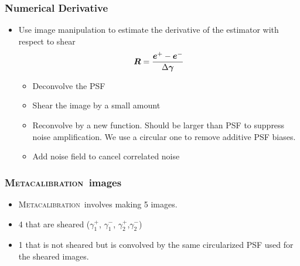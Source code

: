 \documentclass{beamer}
\newcommand{\Mcal}{\textsc{Metacalibration}}
\newcommand{\mcalR}{\mbox{\boldmath $R$}}
\newcommand{\vecg}{\mbox{\boldmath $\gamma$}}
\newcommand{\vest}{\mbox{\boldmath $e$}}
\begin{document}
\frame
{
    \frametitle{Numerical Derivative}

 

       \begin{itemize}

        \item Use image manipulation to estimate the derivative of the
            estimator with respect to shear
            {\color{gold}
                \begin{equation}
                    \mcalR = \frac{\vest^+ - \vest^-}{\Delta \vecg} \nonumber 
                \end{equation}
            }
            \begin{itemize}
                \item Deconvolve the PSF
                \item Shear the image by a small amount
                \item Reconvolve by a new function.  Should be larger than PSF to suppress
                    noise amplification.  We use a circular one to remove
                    additive PSF biases.

                \item {\color{lightsteelblue} Add noise field to cancel correlated noise}
            \end{itemize}


    \end{itemize}

}

\frame
{
    \frametitle{\Mcal\ images}

 

    \begin{itemize}
        \item \Mcal\ involves making 5 images.
        \item 4 that are sheared 
            {\color{gold} ($\gamma_1^+$, $\gamma_1^-$, $\gamma_2^+$,$\gamma_2^-$)}
        \item 1 that is not sheared but is convolved by the same circularized
            PSF used for the sheared images.


    \end{itemize}

}
\end{document}
